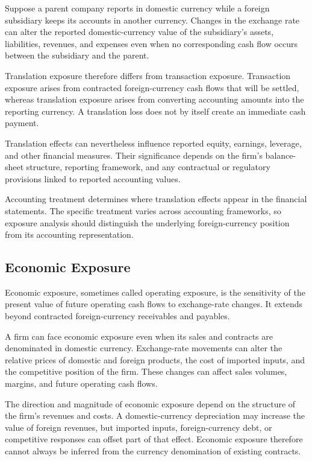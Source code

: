 Suppose a parent company reports in domestic currency while a foreign subsidiary keeps its accounts in another currency. Changes in the exchange rate can alter the reported domestic-currency value of the subsidiary's assets, liabilities, revenues, and expenses even when no corresponding cash flow occurs between the subsidiary and the parent.

Translation exposure therefore differs from transaction exposure. Transaction exposure arises from contracted foreign-currency cash flows that will be settled, whereas translation exposure arises from converting accounting amounts into the reporting currency. A translation loss does not by itself create an immediate cash payment.

Translation effects can nevertheless influence reported equity, earnings, leverage, and other financial measures. Their significance depends on the firm's balance-sheet structure, reporting framework, and any contractual or regulatory provisions linked to reported accounting values.

Accounting treatment determines where translation effects appear in the financial statements. The specific treatment varies across accounting frameworks, so exposure analysis should distinguish the underlying foreign-currency position from its accounting representation.

\subsection{Economic Exposure}

Economic exposure, sometimes called operating exposure, is the sensitivity of the present value of future operating cash flows to exchange-rate changes. It extends beyond contracted foreign-currency receivables and payables.

A firm can face economic exposure even when its sales and contracts are denominated in domestic currency. Exchange-rate movements can alter the relative prices of domestic and foreign products, the cost of imported inputs, and the competitive position of the firm. These changes can affect sales volumes, margins, and future operating cash flows.

The direction and magnitude of economic exposure depend on the structure of the firm's revenues and costs. A domestic-currency depreciation may increase the value of foreign revenues, but imported inputs, foreign-currency debt, or competitive responses can offset part of that effect. Economic exposure therefore cannot always be inferred from the currency denomination of existing contracts.


